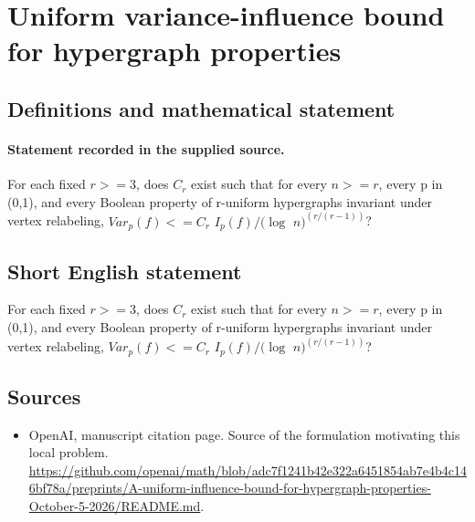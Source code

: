 \documentclass[11pt]{article}
\begin{document}
\section*{Uniform variance-influence bound for hypergraph properties}\label{statement}
\subsection{Definitions and mathematical statement}
\paragraph{Statement recorded in the supplied source.}
For each fixed $r>=3$, does $C_r$ exist such that for every $n>=r$, every p in (0,1), and every Boolean property of r-uniform hypergraphs invariant under vertex relabeling, $Var_p(f)<=C_r$ $I_p(f)/(\log $ $n)^(r/(r-1))$?
\subsection{Short English statement}
For each fixed $r>=3$, does $C_r$ exist such that for every $n>=r$, every p in (0,1), and every Boolean property of r-uniform hypergraphs invariant under vertex relabeling, $Var_p(f)<=C_r$ $I_p(f)/(\log $ $n)^(r/(r-1))$?
\subsection{Sources}
\begin{itemize}
\item[S1] OpenAI, manuscript citation page. Source of the formulation motivating this local problem.
\url{https://github.com/openai/math/blob/adc7f1241b42e322a6451854ab7e4b4c146bf78a/preprints/A-uniform-influence-bound-for-hypergraph-properties-October-5-2026/README.md}.
\end{itemize}
\end{document}
